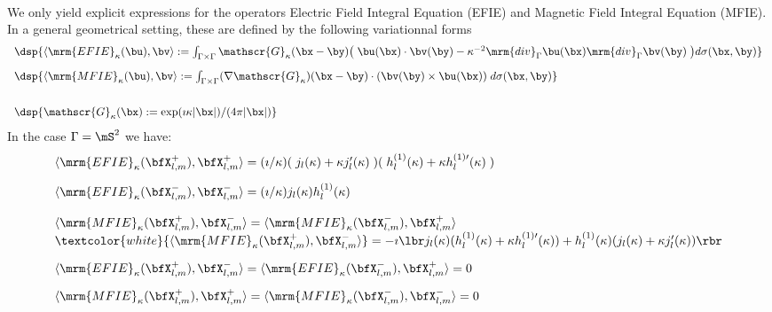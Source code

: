 \documentclass[a4paper,11pt]{article}
\renewcommand{\div}{\mrm{div}}
\begin{document}
\quad\\
We only yield explicit expressions for the operators Electric Field Integral Equation (EFIE) and
Magnetic Field Integral Equation (MFIE). In a general geometrical setting, these are defined by the
following variationnal forms
$$
\begin{array}{l}
\dsp{ \langle \mrm{EFIE}_{\kappa}(\bu),\bv\rangle := \int_{\Gamma\times \Gamma} \mathscr{G}_{\kappa}(\bx-\by)
\big(\; \bu(\bx)\cdot\bv(\by) -\kappa^{-2}\div_{\Gamma}\bu(\bx) \div_{\Gamma}\bv(\by)\; \big) d\sigma(\bx,\by)}\\[10pt]
\dsp{ \langle \mrm{MFIE}_{\kappa}(\bu),\bv\rangle := \int_{\Gamma\times\Gamma}(\nabla \mathscr{G}_{\kappa})(\bx-\by)\cdot
(\bv(\by)\times\bu(\bx)) \;d\sigma(\bx,\by) }\\[20pt]
\dsp{\mathscr{G}_{\kappa}(\bx):=\exp(\imath\kappa\vert \bx\vert)/(4\pi \vert\bx\vert) }
\end{array}
$$
In the case  $\Gamma = \mS^{2}$ we have:
$$
\begin{array}{l}
  \langle \mrm{EFIE}_{\kappa}(\bfX_{l,m}^{+}),\bfX_{l,m}^{+}\rangle
  =  (\imath/\kappa)(\;j_{l}(\kappa)+\kappa j_{l}'(\kappa)\;)(\;h^{(1)}_{l}(\kappa)+\kappa h^{(1)\prime}_{l}(\kappa)\;) \\[10pt]
  \langle \mrm{EFIE}_{\kappa}(\bfX_{l,m}^{-}),\bfX_{l,m}^{-}\rangle
  = (\imath/\kappa)j_{l}(\kappa)h^{(1)}_{l}(\kappa) \\[12.5pt]
\langle \mrm{MFIE}_{\kappa}(\bfX_{l,m}^{+}),\bfX_{l,m}^{-}\rangle =
\langle \mrm{MFIE}_{\kappa}(\bfX_{l,m}^{-}),\bfX_{l,m}^{+}\rangle \\
\textcolor{white}{\langle \mrm{MFIE}_{\kappa}(\bfX_{l,m}^{+}),\bfX_{l,m}^{-}\rangle}
=  -\imath \lbr j_{l}(\kappa)(h_{l}^{(1)}(\kappa)+\kappa h_{l}^{(1)\prime}(\kappa)) +
h_{l}^{(1)}(\kappa)(j_{l}(\kappa)+\kappa j_{l}'(\kappa)) \rbr\\[10pt]


 \langle \mrm{EFIE}_{\kappa}(\bfX_{l,m}^{+}),\bfX_{l,m}^{-}\rangle  =  \langle \mrm{EFIE}_{\kappa}(\bfX_{l,m}^{-}),\bfX_{l,m}^{+}\rangle  = 0\\[10pt]
 \langle \mrm{MFIE}_{\kappa}(\bfX_{l,m}^{+}),\bfX_{l,m}^{+}\rangle  =  \langle \mrm{MFIE}_{\kappa}(\bfX_{l,m}^{-}),\bfX_{l,m}^{-}\rangle  = 0

\end{array}
$$







\end{document}
